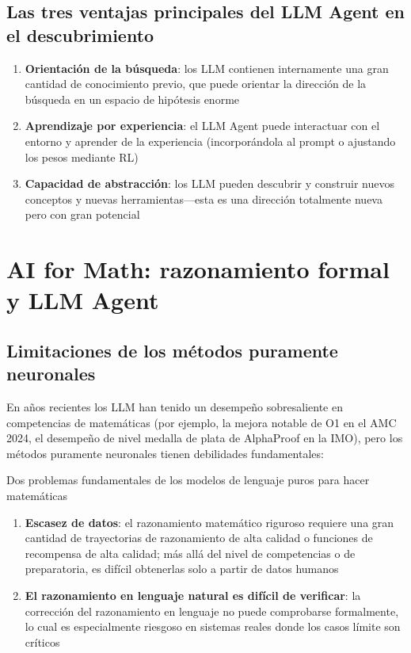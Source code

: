 \documentclass[a4paper]{article}
\begin{document}
\subsection{Las tres ventajas principales del LLM Agent en el descubrimiento}

\begin{enumerate}
    \item \textbf{Orientación de la búsqueda}: los LLM contienen internamente una gran cantidad de conocimiento previo, que puede orientar la dirección de la búsqueda en un espacio de hipótesis enorme
    \item \textbf{Aprendizaje por experiencia}: el LLM Agent puede interactuar con el entorno y aprender de la experiencia (incorporándola al prompt o ajustando los pesos mediante RL)
    \item \textbf{Capacidad de abstracción}: los LLM pueden descubrir y construir nuevos conceptos y nuevas herramientas—esta es una dirección totalmente nueva pero con gran potencial
\end{enumerate}
\section{AI for Math: razonamiento formal y LLM Agent}

\subsection{Limitaciones de los métodos puramente neuronales}

En años recientes los LLM han tenido un desempeño sobresaliente en competencias de matemáticas (por ejemplo, la mejora notable de O1 en el AMC 2024, el desempeño de nivel medalla de plata de AlphaProof en la IMO), pero los métodos puramente neuronales tienen debilidades fundamentales:

\begin{warningbox}{Dos problemas fundamentales de los modelos de lenguaje puros para hacer matemáticas}
\begin{enumerate}
    \item \textbf{Escasez de datos}: el razonamiento matemático riguroso requiere una gran cantidad de trayectorias de razonamiento de alta calidad o funciones de recompensa de alta calidad; más allá del nivel de competencias o de preparatoria, es difícil obtenerlas solo a partir de datos humanos
    \item \textbf{El razonamiento en lenguaje natural es difícil de verificar}: la corrección del razonamiento en lenguaje no puede comprobarse formalmente, lo cual es especialmente riesgoso en sistemas reales donde los casos límite son críticos
\end{enumerate}
\end{warningbox}
\end{document}
